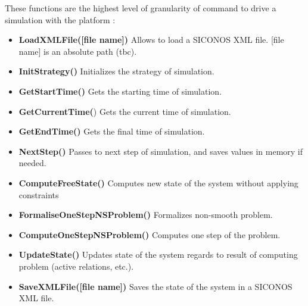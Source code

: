% 

These functions are the highest level of granularity of command to drive a simulation with the platform :

\begin{itemize}
\item\textbf{LoadXMLFile([file name])}
  Allows to load a SICONOS XML file. [file name] is an absolute path (tbc).  

\item \textbf{InitStrategy()}
  Initializes the strategy of simulation.

\item \textbf{GetStartTime()}
  Gets the starting time of simulation.

\item  \textbf{GetCurrentTime(})
  Gets the current time of simulation.

\item \textbf{GetEndTime()}
  Gets the final time of simulation.

\item\textbf{ NextStep()}
  Passes to next step of simulation, and saves values in memory if needed.

\item \textbf{ComputeFreeState()}
  Computes new state of the system without applying constraints

\item \textbf{FormaliseOneStepNSProblem()}
  Formalizes non-smooth problem.

\item \textbf{ComputeOneStepNSProblem()}
  Computes one step of the problem.

\item \textbf{UpdateState()}
  Updates state of the system regards to result of computing problem (active relations, etc.).

\item \textbf{SaveXMLFile([file name])}
  Saves the state of the system in a SICONOS XML file.

\end{itemize}
